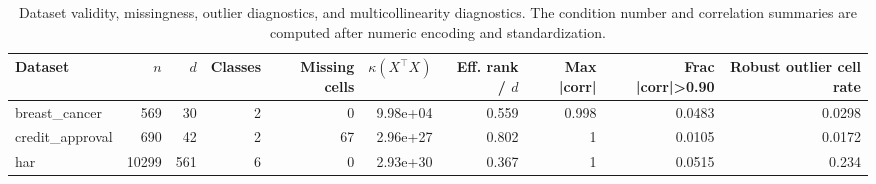 \begin{table}[t]
\centering
\begin{tabular}{lrrrrrrrrr}
\toprule
Dataset & $n$ & $d$ & Classes & Missing cells & $\kappa(X^\top X)$ & Eff. rank / $d$ & Max |corr| & Frac |corr|>0.90 & Robust outlier cell rate \\
\midrule
breast_cancer & 569 & 30 & 2 & 0 & 9.98e+04 & 0.559 & 0.998 & 0.0483 & 0.0298 \\
credit_approval & 690 & 42 & 2 & 67 & 2.96e+27 & 0.802 & 1 & 0.0105 & 0.0172 \\
har & 10299 & 561 & 6 & 0 & 2.93e+30 & 0.367 & 1 & 0.0515 & 0.234 \\
\bottomrule
\end{tabular}

\caption{Dataset validity, missingness, outlier diagnostics, and multicollinearity diagnostics. The condition number and correlation summaries are computed after numeric encoding and standardization.}
\label{tab:revision_dataset_audit}
\end{table}